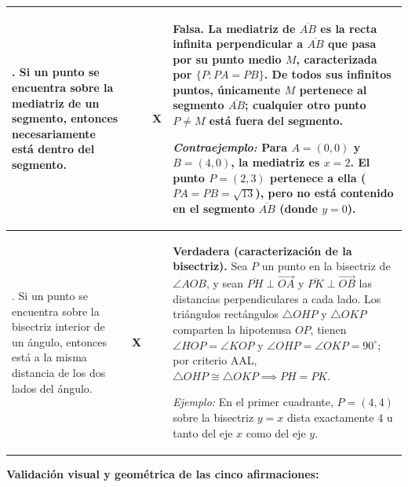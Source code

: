 \documentclass[spanish,letterpaper]{article}
\begin{document}
\begin{tabularx}{\textwidth}{|>{\raggedright\arraybackslash}p{}|>{\centering\arraybackslash}p{}|>{\centering\arraybackslash}p{}|>{\raggedright\arraybackslash}X|}
4. Si un punto se encuentra sobre la mediatriz de un segmento, entonces necesariamente está dentro del segmento. &
&
\textbf{\large\color{errRed}X} &
\textbf{Falsa.} La mediatriz de $\overline{AB}$ es la \textbf{recta infinita} perpendicular a $\overline{AB}$ que pasa por su punto medio $M$, caracterizada por $\{P : PA = PB\}$. De todos sus infinitos puntos, únicamente $M$ pertenece al segmento $\overline{AB}$; cualquier otro punto $P \neq M$ está \textbf{fuera} del segmento.\par\smallskip
\textit{Contraejemplo:} Para $A=(0,0)$ y $B=(4,0)$, la mediatriz es $x=2$. El punto $P=(2,3)$ pertenece a ella ($PA=PB=\sqrt{13}$), pero no está contenido en el segmento $\overline{AB}$ (donde $y=0$). \\\hline

5. Si un punto se encuentra sobre la bisectriz interior de un ángulo, entonces está a la misma distancia de los dos lados del ángulo. &
\textbf{\large\color{okGreen}X} &
&
\textbf{Verdadera (caracterización de la bisectriz).} Sea $P$ un punto en la bisectriz de $\angle AOB$, y sean $\overline{PH}\perp \overrightarrow{OA}$ y $\overline{PK}\perp \overrightarrow{OB}$ las distancias perpendiculares a cada lado. Los triángulos rectángulos $\triangle OHP$ y $\triangle OKP$ comparten la hipotenusa $OP$, tienen $\angle HOP = \angle KOP$ y $\angle OHP = \angle OKP = 90^\circ$; por criterio AAL, $\triangle OHP \cong \triangle OKP \implies PH = PK$.\par\smallskip
\textit{Ejemplo:} En el primer cuadrante, $P=(4,4)$ sobre la bisectriz $y=x$ dista exactamente $4\text{ u}$ tanto del eje $x$ como del eje $y$. \\\hline
\end{tabularx}

\vspace{6pt}
{\scriptsize\textbf{Validación visual y geométrica de las cinco afirmaciones:}}
\end{document}

